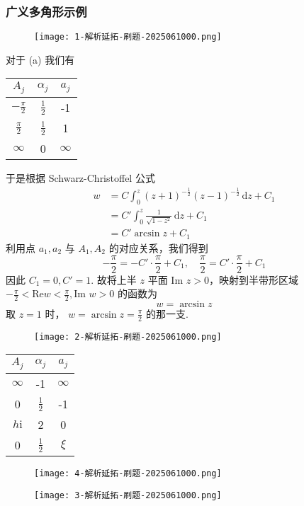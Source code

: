 \subsubsection{广义多角形示例}

\begin{figure}[H]
\centering
\texttt{[image: 1-解析延拓-刷题-2025061000.png]}
\label{}
\end{figure}

对于 (a) 我们有

\begin{table}[h]
	\centering
	\begin{tabular}{|c|c|c|}
		\hline
		$A_j$ & $\alpha_{j}$ & $a_j$ \\
		\hline
		$-\frac{\pi}{2}$ & $\frac{1}{2}$ & -1 \\
		\hline
		$\frac{\pi}{2}$ & $\frac{1}{2}$ & 1 \\
		\hline
		$\infty$ & 0 & $\infty$ \\
		\hline
	\end{tabular}
\end{table}
于是根据 Schwarz-Christoffel 公式
\[
\begin{aligned}
w & =C\int_{0}^{z} (z+1)^{-\frac{1}{2}}(z-1)^{-\frac{1}{2}} \, \mathrm{d}z+C_1 \\
 & =C'\int_{0}^{z} \frac{1}{\sqrt{ 1-z^{2} }} \, \mathrm{d}z+C_1 \\
 & =C'\arcsin z+C_1
\end{aligned} 
\]
利用点 $a_1,a_2$ 与 $A_1,A_2$ 的对应关系，我们得到
\[
-\frac{\pi}{2}=-C'\cdot\frac{\pi}{2}+C_1,\quad \frac{\pi}{2}=C'\cdot\frac{\pi}{2}+C_1
\]
因此 $C_1=0,C'=1$. 故将上半 $z$ 平面 $\text{Im }z>0$，映射到半带形区域 $-\frac{\pi}{2}<\mathrm{Re }w<\frac{\pi}{2},\text{Im }w>0$ 的函数为
\[
w=\arcsin z
\]
取 $z=1$ 时， $w=\arcsin z=\frac{\pi}{2}$ 的那一支.

\begin{figure}[H]
\centering
\texttt{[image: 2-解析延拓-刷题-2025061000.png]}
\label{}
\end{figure}

\begin{table}[h]
	\centering
	\begin{tabular}{|c|c|c|}
		\hline
		$A_j$ & $\alpha _j$ & $a_{j}$ \\
		\hline
		$\infty$ & -1 & $\infty$ \\
		\hline
		0 & $\frac{1}{2}$ & -1 \\
		\hline
		$h \mathrm{i}$ & 2 & 0 \\
		\hline
		0 & $\frac{1}{2}$ & $\xi$ \\
		\hline
	\end{tabular}
\end{table}
\begin{figure}[H]
\centering
\texttt{[image: 4-解析延拓-刷题-2025061000.png]}
\label{}
\end{figure}
\begin{figure}[H]
\centering
\texttt{[image: 3-解析延拓-刷题-2025061000.png]}
\label{}
\end{figure}

